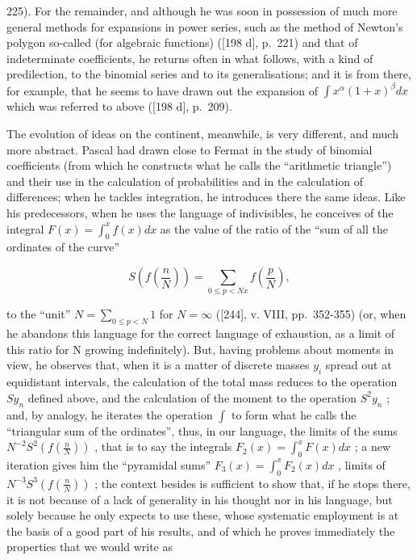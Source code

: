 225). For the remainder, and although he was soon in possession of much more general methods for expansions in power series, such as the method of Newton's polygon so-called (for algebraic functions) ({[}198 d{]}, p.~221) and that of indeterminate coefficients, he returns often in what follows, with a kind of predilection, to the binomial series and to its generalisations; and it is from there, for example, that he seems to have drawn out the expansion of \(\int x^{\alpha}(1 + x)^{\beta} dx\) which was referred to above ({[}198 d{]}, p.~209).

The evolution of ideas on the continent, meanwhile, is very different, and much more abstract. Pascal had drawn close to Fermat in the study of binomial coefficients (from which he constructs what he calls the ``arithmetic triangle'') and their use in the calculation of probabilities and in the calculation of differences; when he tackles integration, he introduces there the same ideas. Like his predecessors, when he uses the language of indivisibles, he conceives of the integral \(F(x) = \int_{0}^{x} f(x) dx\) as the value of the ratio of the ``sum of all the ordinates of the curve''

\[
S \left(f \left(\frac {n}{N}\right)\right) = \sum_ {0 \leq p <   N x} f \left(\frac {p}{N}\right),
\]

to the ``unit'' \(N = \sum_{0 \leq p < N} 1\) for \(N = \infty\) ({[}244{]}, v. VIII, pp.~352-355) (or, when he abandons this language for the correct language of exhaustion, as a limit of this ratio for N growing indefinitely). But, having problems about moments in view, he observes that, when it is a matter of discrete masses \(y_{i}\) spread out at equidistant intervals, the calculation of the total mass reduces to the operation \(Sy_{n}\) defined above, and the calculation of the moment to the operation \(S^{2}y_{n}\) ; and, by analogy, he iterates the operation \(\int\) to form what he calls the ``triangular sum of the ordinates'', thus, in our language, the limits of the sums \(N^{-2}S^{2}\left(f\left(\frac{n}{N}\right)\right)\) , that is to say the integrals \(F_{2}(x) = \int_{0}^{x} F(x)dx\) ; a new iteration gives him the ``pyramidal sums'' \(F_{3}(x) = \int_{0}^{x} F_{2}(x)dx\) , limits of \(N^{-3}S^{3}\left(f\left(\frac{n}{N}\right)\right)\) ; the context besides is sufficient to show that, if he stops there, it is not because of a lack of generality in his thought nor in his language, but solely because he only expects to use these, whose systematic employment is at the basis of a good part of his results, and of which he proves immediately the properties that we would write as

